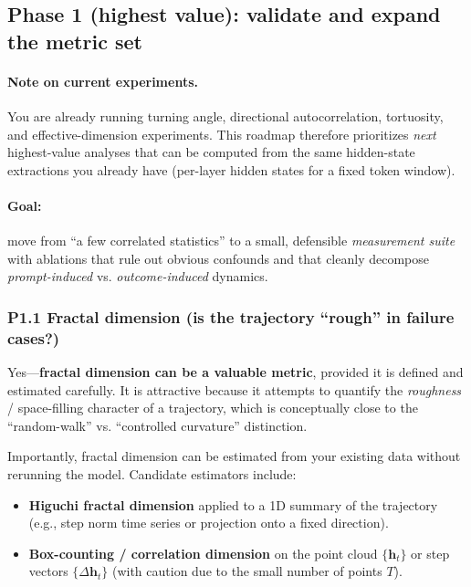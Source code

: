 \subsection{Phase 1 (highest value): validate and expand the metric set}

\paragraph{Note on current experiments.} You are already running turning angle, directional autocorrelation, tortuosity, and effective-dimension experiments. This roadmap therefore prioritizes \emph{next} highest-value analyses that can be computed from the same hidden-state extractions you already have (per-layer hidden states for a fixed token window).

\paragraph{Goal:} move from ``a few correlated statistics'' to a small, defensible \emph{measurement suite} with ablations that rule out obvious confounds and that cleanly decompose \emph{prompt-induced} vs. \emph{outcome-induced} dynamics.

\subsubsection{P1.1 Fractal dimension (is the trajectory ``rough'' in failure cases?)}

Yes---\textbf{fractal dimension can be a valuable metric}, provided it is defined and estimated carefully.
It is attractive because it attempts to quantify the \emph{roughness} / space-filling character of a trajectory, which is conceptually close to the ``random-walk'' vs. ``controlled curvature'' distinction.

Importantly, fractal dimension can be estimated from your existing data without rerunning the model.
Candidate estimators include:
\begin{itemize}[leftmargin=*]
\item \textbf{Higuchi fractal dimension} applied to a 1D summary of the trajectory (e.g., step norm time series or projection onto a fixed direction).
\item \textbf{Box-counting / correlation dimension} on the point cloud $\{\mathbf{h}_t\}$ or step vectors $\{\Delta\mathbf{h}_t\}$ (with caution due to the small number of points $T$).
\end{itemize}

